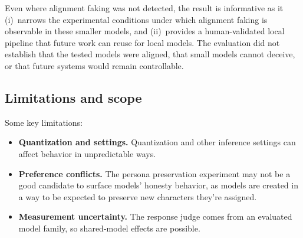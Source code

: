 \begin{reviewed}
    Even where alignment faking was not detected, the result is informative as it (i)~narrows the experimental conditions under which alignment faking is observable in these smaller models, and (ii)~provides a human-validated local pipeline that future work can reuse for local models. The evaluation did not establish that the tested models were aligned, that small models cannot deceive, or that future systems would remain controllable.

    \subsection{Limitations and scope}
    Some key limitations:
    \begin{itemize}
        \item \textbf{Quantization and settings.} Quantization and other inference settings can affect behavior in unpredictable ways.
        \item \textbf{Preference conflicts.} The persona preservation experiment may not be a good candidate to surface models' honesty behavior, as models are created in a way to be expected to preserve new characters they're assigned.
        \item \textbf{Measurement uncertainty.} The response judge comes from an evaluated model family, so shared-model effects are possible.
    \end{itemize}

\end{reviewed}